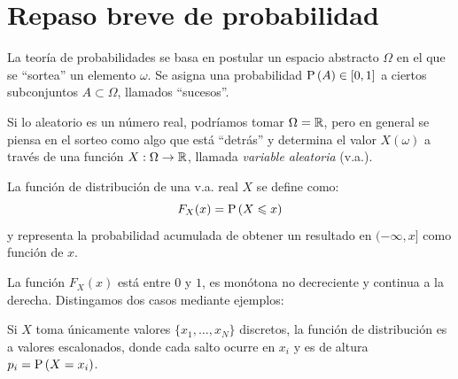 \section{Repaso breve de probabilidad}\label{app:probabilidad}

La teoría de probabilidades se basa en postular un espacio
abstracto $\Omega$ en el que se ``sortea'' un elemento $\omega$.
Se asigna una probabilidad $\mathrm{P}\left(A\right)\in [0,1]$ a ciertos subconjuntos
$A\subset\Omega$, llamados ``sucesos''.

Si lo aleatorio es un número real, podríamos tomar $\Omega=\mathbb{R}$,
pero en general se piensa en el sorteo como algo que está
``detrás'' y determina el valor $X(\omega)$ a través de una función
$X:\Omega\rightarrow\mathbb{R}$, llamada \emph{variable aleatoria} (v.a.).

\begin{definicion}
    La función de distribución de una v.a. real $X$ se define como:
    \begin{equation*}
    F_X(x)=\mathrm{P}\left(X\leqslant x\right)
    \end{equation*}
    y representa la probabilidad acumulada de obtener un resultado en $(-\infty,x]$ como función de $x$.
\end{definicion}

La función $F_X(x)$ está entre $0$ y $1$, es monótona no decreciente y continua a la derecha. Distingamos dos casos mediante ejemplos:

\begin{ejemplo}
    Si $X$ toma únicamente valores $\{x_1, \ldots, x_N\}$ discretos, la función de distribución es a valores escalonados, donde cada salto ocurre en $x_i$ y es de altura $p_i=\mathrm{P}\left(X=x_i\right)$.

    \begin{center}
    \end{center}
\end{ejemplo}

